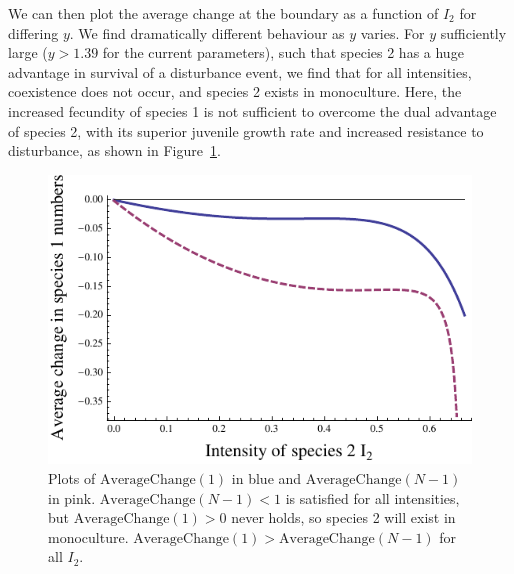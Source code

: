 We can then plot the average change at the boundary as a function of $I_2$ for differing $y$. We find dramatically different behaviour as $y$ varies. For $y$ sufficiently large ($y>1.39$ for the current parameters), such that species 2 has a huge advantage in survival of a disturbance event, we find that for all intensities, coexistence does not occur, and species 2 exists in monoculture. Here, the increased fecundity of species 1 is not sufficient to overcome the dual advantage of species 2, with its superior juvenile growth rate and increased resistance to disturbance, as shown in Figure~\ref{largey}.
\begin{figure}[htbp]
\includegraphics[width=4.5in]{highy}
\caption{Plots of $\text{AverageChange}(1)$ in blue and $\text{AverageChange}(N-1)$ in pink. $\text{AverageChange}(N-1)<1$ is satisfied for all intensities, but $\text{AverageChange}(1)>0$ never holds, so species 2 will exist in monoculture. $\text{AverageChange}(1)>\text{AverageChange}(N-1)$ for all $I_2$.}
\label{largey}
\end{figure}
